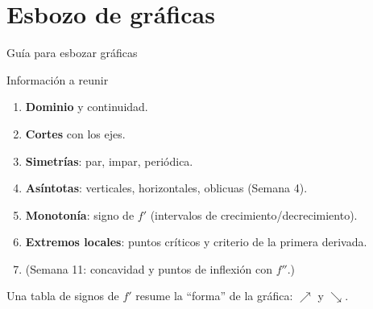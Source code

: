 \documentclass[10pt,aspectratio=169]{beamer}
\begin{document}
\section{Esbozo de gráficas}

\begin{frame}{Guía para esbozar gráficas}
  \begin{block}{Información a reunir}
    \begin{enumerate}
      \item \textbf{Dominio} y continuidad.
      \item \textbf{Cortes} con los ejes.
      \item \textbf{Simetrías}: par, impar, periódica.
      \item \textbf{Asíntotas}: verticales, horizontales, oblicuas (Semana 4).
      \item \textbf{Monotonía}: signo de $f'$ (intervalos de crecimiento/decrecimiento).
      \item \textbf{Extremos locales}: puntos críticos y criterio de la primera derivada.
      \item (Semana 11: concavidad y puntos de inflexión con $f''$.)
    \end{enumerate}
  \end{block}
  \begin{idea}
    Una tabla de signos de $f'$ resume la ``forma'' de la gráfica: $\nearrow$ y $\searrow$.
  \end{idea}
\end{frame}
\end{document}
